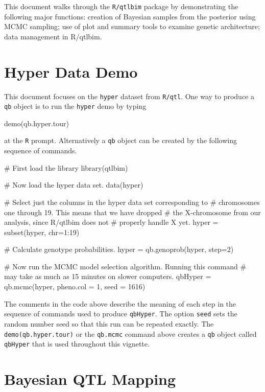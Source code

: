\documentclass{article}
\begin{document}
This document walks through the {\tt R/qtlbim} package by
demonstrating the following major functions: creation of Bayesian
samples from the posterior using MCMC sampling; use of plot and
summary tools to examine genetic architecture; data management in
R/qtlbim.


\section{Hyper Data Demo}

This document focuses on the \texttt{hyper} dataset
from \texttt{R/qtl}. 
One way to produce a \texttt{qb} object is to run
the \texttt{hyper} demo by typing
\begin{Schunk}
\begin{Sinput}
demo(qb.hyper.tour)
\end{Sinput}
\end{Schunk}
at the \texttt{R} prompt. 
Alternatively a \texttt{qb} object 
can be created by the  following sequence of commands. 
\begin{Schunk}
\begin{Sinput}
# First load the library
library(qtlbim)

# Now load the hyper data set.
data(hyper)

# Select just the columns in the hyper data set corresponding to  
# chromosomes one through 19.  This means that we have dropped
# the X-chromosome from our analysis, since R/qtlbim does not
# properly handle X yet.
hyper = subset(hyper, chr=1:19)

# Calculate genotype  probabilities.
hyper = qb.genoprob(hyper, step=2) 

# Now run the MCMC model selection algorithm. Running this command 
# may take as much as 15 minutes on slower computers.
qbHyper = qb.mcmc(hyper, pheno.col = 1, seed = 1616)
\end{Sinput}
\end{Schunk}

The comments in the code above describe the meaning of each step in
the sequence of commands used to produce \texttt{qbHyper}. The option
\texttt{seed} sets the random number seed so that this run can be
repeated exactly. The \texttt{demo(qb.hyper.tour)} or the 
\texttt{qb.mcmc} command above creates a \texttt{qb} object called
\texttt{qbHyper} that is used throughout this vignette.

\section{Bayesian QTL Mapping}
\end{document}
